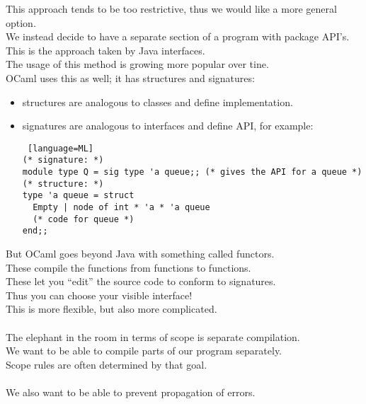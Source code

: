 \documentclass[../../lecture_notes.tex]{subfiles}
\begin{document}
\noindent This approach tends to be too restrictive, thus we would like a more general option.\\
We instead decide to have a separate section of a program with package API’s.\\
\indent This is the approach taken by Java interfaces.\\
\indent The usage of this method is growing more popular over tine.\\
\indent \indent OCaml uses this as well; it has structures and signatures: \begin{itemize} [itemsep=0mm]
			\item structures are analogous to classes and define implementation.
			\item signatures are analogous to interfaces and define API, for example:
				\begin{lstlisting} [language=ML]
(* signature: *)
module type Q = sig type 'a queue;; (* gives the API for a queue *)
(* structure: *)
type 'a queue = struct
  Empty | node of int * 'a * 'a queue
  (* code for queue *)
end;;
				\end{lstlisting}
		\end{itemize}
\indent But OCaml goes beyond Java with something called functors.\\
\indent These compile the functions from functions to functions.\\
\indent These let you “edit” the source code to conform to signatures.\\
\indent Thus you can choose your visible interface!\\
\indent This is more flexible, but also more complicated.\\
\\
The elephant in the room in terms of scope is separate compilation.\\
	\indent We want to be able to compile parts of our program separately.\\
Scope rules are often determined by that goal.\\
\\
We also want to be able to prevent propagation of errors.\\
\end{document}
